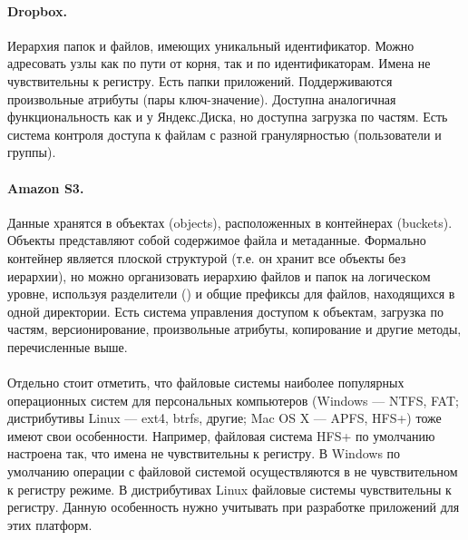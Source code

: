     \paragraph{Dropbox\cite{dropbox-docs}.} Иерархия папок и файлов, имеющих уникальный идентификатор. Можно адресовать узлы как по пути от корня, так и по идентификаторам. Имена не чувствительны к регистру. Есть папки приложений. Поддерживаются произвольные атрибуты (пары ключ-значение). Доступна аналогичная функциональность как и у Яндекс.Диска, но доступна загрузка по частям. Есть система контроля доступа к файлам с разной гранулярностью (пользователи и группы).

    \paragraph{Amazon S3\cite{amazon-s3-docs}.} Данные хранятся в объектах (objects), расположенных в контейнерах (buckets). Объекты представляют собой содержимое файла и метаданные. Формально контейнер является плоской структурой (т.е. он хранит все объекты без иерархии), но можно организовать иерархию файлов и папок на логическом уровне, используя разделители (\code{/}) и общие префиксы для файлов, находящихся в одной директории. Есть система управления доступом к объектам, загрузка по частям, версионирование, произвольные атрибуты, копирование и другие методы, перечисленные выше.

    \paragraph{} Отдельно стоит отметить, что файловые системы наиболее популярных операционных систем для персональных компьютеров (Windows --- NTFS, FAT; дистрибутивы Linux --- ext4, btrfs, другие; Mac OS X --- APFS, HFS+) тоже имеют свои особенности. Например, файловая система HFS+ по умолчанию настроена так, что имена не чувствительны к регистру. В Windows по умолчанию операции с файловой системой осуществляются в не чувствительном к регистру режиме\cite{windows-case-sensitivity}. В дистрибутивах Linux файловые системы чувствительны к регистру. Данную особенность нужно учитывать при разработке приложений для этих платформ.


